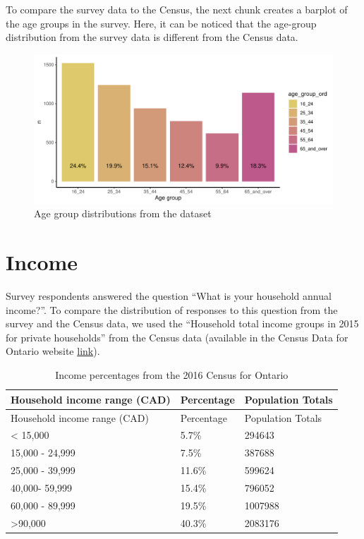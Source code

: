 \documentclass[
]{article}
\begin{document}
To compare the survey data to the Census, the next chunk creates a
barplot of the age groups in the survey. Here, it can be noticed that
the age-group distribution from the survey data is different from the
Census data.

\begin{figure}

{\centering \includegraphics{appendix_files/figure-pdf/trends-by-age-1.pdf}

}

\caption{Age group distributions from the dataset}

\end{figure}

\hypertarget{income}{%
\section{Income}\label{income}}

Survey respondents answered the question ``What is your household annual
income?''. To compare the distribution of responses to this question
from the survey and the Census data, we used the ``Household total
income groups in 2015 for private households'' from the Census data
(available in the Census Data for Ontario website
\href{https://www12.statcan.gc.ca/census-recensement/2016/dp-pd/prof/details/page.cfm?Lang=E\&Geo1=PR\&Code1=35\&Geo2=PR\&Code2=01\&SearchText=Ontario\&SearchType=Begins\&SearchPR=01\&B1=Income\&TABID=1\&type=1}{link}).

\begin{longtable}[]{@{}lll@{}}
\caption{Income percentages from the 2016 Census for
Ontario}\tabularnewline
\toprule\noalign{}
Household income range (CAD) & Percentage & Population Totals \\
\midrule\noalign{}
\endfirsthead
\toprule\noalign{}
Household income range (CAD) & Percentage & Population Totals \\
\midrule\noalign{}
\endhead
\bottomrule\noalign{}
\endlastfoot
\textless{} 15,000 & 5.7\% & 294643 \\
15,000 - 24,999 & 7.5\% & 387688 \\
25,000 - 39,999 & 11.6\% & 599624 \\
40,000- 59,999 & 15.4\% & 796052 \\
60,000 - 89,999 & 19.5\% & 1007988 \\
\textgreater90,000 & 40.3\% & 2083176 \\
\end{longtable}
\end{document}
